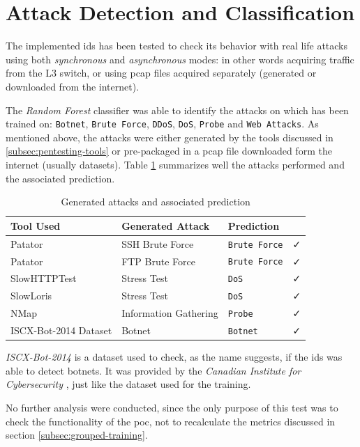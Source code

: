 \section{Attack Detection and Classification}
\label{sec:attack-detection}

The implemented \gls{ids} has been tested to check its behavior with real life attacks using both \textit{synchronous} and \textit{asynchronous} modes: in other words acquiring traffic from the L3 switch, or using \gls{pcap} files acquired separately (generated or downloaded from the internet).
\par The \textit{Random Forest} classifier was able to identify the attacks on which has been trained on: \texttt{Botnet}, \texttt{Brute Force}, \texttt{DDoS}, \texttt{DoS}, \texttt{Probe} and \texttt{Web Attacks}. As mentioned above, the attacks were either generated by the tools discussed in \ref{subsec:pentesting-tools} or pre-packaged in a \gls{pcap} file downloaded form the internet (usually datasets). Table \ref{tab:attack-predictions} summarizes well the attacks performed and the associated prediction.

\begin{table}[h!]
   \centering
   \begin{tabular}{l|lll}
       \toprule 
       Tool Used & Generated Attack & Prediction & \\
       \midrule
       \rowcolor{black!10} Patator & SSH Brute Force & \texttt{Brute Force} & \faCheck \\
       Patator & FTP Brute Force & \texttt{Brute Force} & \faCheck \\
       \rowcolor{black!10} SlowHTTPTest & Stress Test & \texttt{DoS} & \faCheck \\
       SlowLoris & Stress Test & \texttt{DoS} & \faCheck \\
       \rowcolor{black!10} NMap & Information Gathering & \texttt{Probe} & \faCheck \\
       ISCX-Bot-2014 Dataset & Botnet & \texttt{Botnet} & \faCheck \\
       \bottomrule
   \end{tabular}
   \caption{Generated attacks and associated prediction}
   \label{tab:attack-predictions}
\end{table}
\textit{ISCX-Bot-2014} is a dataset used to check, as the name suggests, if the \gls{ids} was able to detect botnets. It was provided by the \textit{Canadian Institute for Cybersecurity} \cite{Beigi2014}, just like the dataset used for the training.
\par No further analysis were conducted, since the only purpose of this test was to check the functionality of the \gls{poc}, not to recalculate the metrics discussed in section \ref{subsec:grouped-training}.